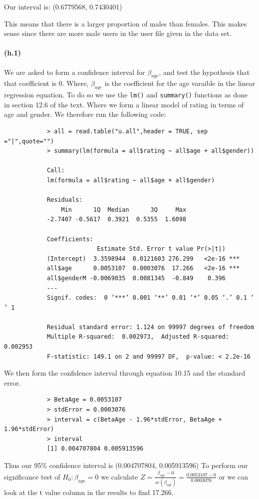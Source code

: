 \documentclass[fleqn]{article}
\begin{document}
		Our interval is: (0.6779568, 0.7430401)

		This means that there is a larger proportion of males than females. This makes sense since there are more male users in the user file given in the data set.

	\paragraph{(h.1)}
		We are asked to form a confidence interval for $\beta_{age}$, and test the hypothesis that that coefficient is 0. Where, $\beta_{age}$ is the coefficient for the age varaible in the linear regression equation. To do so we use the \texttt{lm()} and \texttt{summary()} functions as done in section 12.6 of the text. Where we form a linear model of rating in terms of age and gender. We therefore run the following code:
		\begin{verbatim} 
			> all = read.table("u.all",header = TRUE, sep ="|",quote="")
			> summary(lm(formula = all$rating ~ all$age + all$gender))

			Call:
			lm(formula = all$rating ~ all$age + all$gender)

			Residuals:
			    Min      1Q  Median      3Q     Max 
			-2.7407 -0.5617  0.3921  0.5355  1.6098 

			Coefficients:
			              Estimate Std. Error t value Pr(>|t|)    
			(Intercept)  3.3598944  0.0121603 276.299   <2e-16 ***
			all$age      0.0053107  0.0003076  17.266   <2e-16 ***
			all$genderM -0.0069035  0.0081345  -0.849    0.396    
			---
			Signif. codes:  0 ‘***’ 0.001 ‘**’ 0.01 ‘*’ 0.05 ‘.’ 0.1 ‘ ’ 1

			Residual standard error: 1.124 on 99997 degrees of freedom
			Multiple R-squared:  0.002973,	Adjusted R-squared:  0.002953 
			F-statistic: 149.1 on 2 and 99997 DF,  p-value: < 2.2e-16
		\end{verbatim}
		We then form the confidence interval through equation 10.15 and the standard error.
		\begin{verbatim} 
			> BetaAge = 0.0053107
			> stdError = 0.0003076
			> interval = c(BetaAge - 1.96*stdError, BetaAge + 1.96*stdError)
			> interval
			[1] 0.004707804 0.005913596
		\end{verbatim} 

		Thus our 95\% confidence interval is (0.004707804, 0.005913596)
		To perform our significance test of $H_0: \beta_{age} =0$ we calculate
		$Z = \frac{\beta_{age} - 0}{se(\beta_{age})} = \frac{0.0053107 - 0}{0.0003076}$
		or we can look at the t value column in the results to find 17.266.
\end{document}
